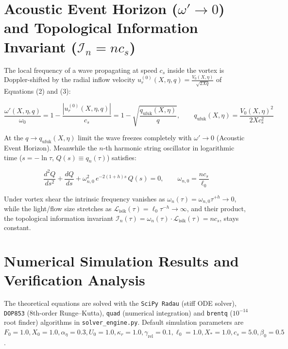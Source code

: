 \documentclass[12pt,a4paper]{article}
\begin{document}
\section{Acoustic Event Horizon ($\omega' \to 0$) and Topological Information Invariant ($\mathcal{I}_n = n c_s$)}

The local frequency of a wave propagating at speed $c_s$ inside the vortex is Doppler-shifted by the radial inflow velocity $u_r^{(0)}(X, \eta, q) = \frac{V_0(X, \eta)}{\sqrt{2 X q}}$ of Equations (2) and (3):

\begin{equation}
\frac{\omega'(X, \eta, q)}{\omega_0} = 1 - \frac{|u_r^{(0)}(X, \eta, q)|}{c_s} = 1 - \sqrt{\frac{q_{\mathrm{ufuk}}(X, \eta)}{q}}, \qquad q_{\mathrm{ufuk}}(X, \eta) = \frac{V_0(X, \eta)^2}{2 X c_s^2}
\label{eq:horizon}
\end{equation}

At the $q \to q_{\mathrm{ufuk}}(X, \eta)$ limit the wave freezes completely with $\omega' \to 0$ (Acoustic Event Horizon). Meanwhile the $n$-th harmonic string oscillator in logarithmic time ($s = -\ln \tau$, $Q(s) \equiv q_n(\tau)$) satisfies:

\begin{equation}
\frac{d^2 Q}{ds^2} + \frac{dQ}{ds} + \omega_{n,0}^2 \, e^{-2(1+h)s} \, Q(s) = 0, \qquad \omega_{n,0} = \frac{n c_s}{\ell_0}
\label{eq:oscillator}
\end{equation}

Under vortex shear the intrinsic frequency vanishes as $\omega_n(\tau) = \omega_{n,0} \tau^{+h} \to 0$, while the light/flow size stretches as $\mathcal{L}_{\mathrm{isik}}(\tau) = \ell_0 \tau^{-h} \to \infty$, and their product, the topological information invariant $\mathcal{I}_n(\tau) = \omega_n(\tau) \cdot \mathcal{L}_{\mathrm{isik}}(\tau) = n c_s$, stays constant.

\section{Numerical Simulation Results and Verification Analysis}

The theoretical equations are solved with the \texttt{SciPy Radau} (stiff ODE solver), \texttt{DOP853} (8th-order Runge--Kutta), \texttt{quad} (numerical integration) and \texttt{brentq} ($10^{-14}$ root finder) algorithms in \texttt{solver\_engine.py}. Default simulation parameters are $F_0 = 1.0, X_0 = 1.0, \alpha_\eta = 0.3, U_0 = 1.0, \kappa_r = 1.0, \gamma_{\mathrm{rel}} = 0.1, \ell_0 = 1.0, X_* = 1.0, c_s = 5.0, \beta_0 = 0.5$.
\end{document}

